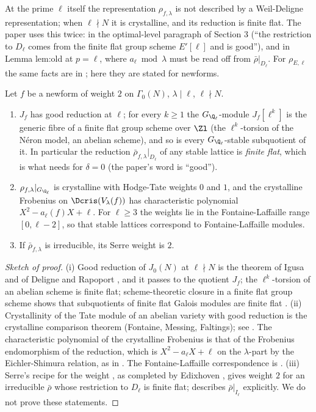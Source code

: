 At the prime $\ell$ itself the representation $\rho_{f,\lambda}$ is not described by a Weil-Deligne representation; when $\ell\nmid N$ it is crystalline, and its
reduction is finite flat. The paper uses this twice: in the optimal-level paragraph of Section 3 (``the restriction to $D_\ell$ comes from the finite
flat group scheme $E'[\ell]$ and is good''), and in Lemma lem:old at $p=\ell$, where $a_\ell\bmod\lambda$ must be read off from $\bar\rho|_{D_\ell}$. For $\rho_{E,\ell}$ the
same facts are in ; here they are stated for newforms.

\begin{theorem}\label{thm:modgalrep:crystalline}
Let $f$ be a newform of weight $2$ on $\Gamma_0(N)$, $\lambda\mid\ell$, $\ell\nmid N$.
\begin{enumerate}[label=(\roman*)]
\item $J_f$ has good reduction at $\ell$; for every $k\ge1$ the $G_{\Q_\ell}$-module $J_f[\ell^k]$ is the generic fibre of a finite flat group scheme over $\Zl$ (the
$\ell^k$-torsion of the N\'eron model, an abelian scheme), and so is every $G_{\Q_\ell}$-stable subquotient of it. In particular the reduction $\bar\rho_{f,\lambda}|_{D_\ell}$
of any stable lattice is \emph{finite flat}, which is what  needs for $\delta=0$ (the paper's word is ``good'').
\item $\rho_{f,\lambda}|_{G_{\Q_\ell}}$ is crystalline with Hodge-Tate weights $0$ and $1$, and the crystalline Frobenius on $\Dcris(V_\lambda(f))$ has characteristic
polynomial $X^2-a_\ell(f)X+\ell$. For $\ell\ge3$ the weights lie in the Fontaine-Laffaille range $[0,\ell-2]$, so that stable lattices correspond to
Fontaine-Laffaille modules.
\item If $\bar\rho_{f,\lambda}$ is irreducible, its Serre weight is $2$.
\end{enumerate}
\end{theorem}

\begin{proof}[Sketch of proof]
(i) Good reduction of $J_0(N)$ at $\ell\nmid N$ is the theorem of Igusa and of Deligne and Rapoport \cite{DeligneRapoport73}, and it passes to the quotient
$J_f$; the $\ell^k$-torsion of an abelian scheme is finite flat; scheme-theoretic closure in a finite flat group scheme shows that subquotients of
finite flat Galois modules are finite flat \cite{DDT}. (ii) Crystallinity of the Tate module of an abelian variety with good reduction is the
crystalline comparison theorem (Fontaine, Messing, Faltings); see \cite{Berger}. The characteristic polynomial of the crystalline Frobenius is that of
the Frobenius endomorphism of the reduction, which is $X^2-a_\ell X+\ell$ on the $\lambda$-part by the Eichler-Shimura relation, as in
. The Fontaine-Laffaille correspondence is \cite{FontaineLaffaille}. (iii) Serre's recipe for the weight
\cite{Serre87}, as completed by Edixhoven \cite{Edixhoven92}, gives weight $2$ for an irreducible $\bar\rho$ whose restriction to $D_\ell$ is finite flat;
 describes $\bar\rho|_{I_\ell}$ explicitly. We do not prove these statements.
\end{proof}

